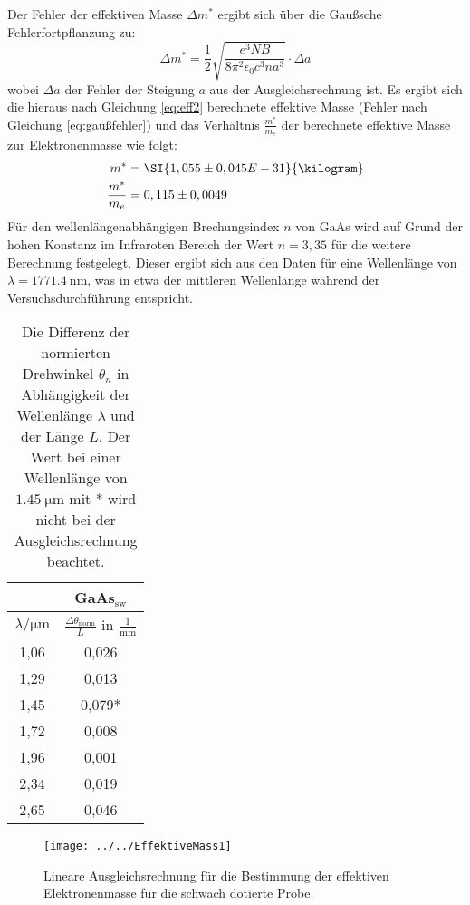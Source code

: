 Der Fehler der effektiven Masse $\Delta m^*$ ergibt sich über die Gaußsche Fehlerfortpflanzung zu:
\begin{equation}
\label{eq:gaußfehler}
\Delta m^* = \frac{1}{2}\sqrt{\frac{e^3NB}{8\pi^2\epsilon_0c^3na^3}} \cdot \Delta a
\end{equation}
wobei $\Delta a$ der Fehler der Steigung $a$ aus der Ausgleichsrechnung ist. Es ergibt sich die hieraus nach Gleichung \ref{eq:eff2} berechnete effektive Masse (Fehler nach Gleichung \ref{eq:gaußfehler}) und das Verhältnis $\frac{m^*}{m_e}$ der berechnete effektive Masse zur Elektronenmasse\cite{Elektronenmasse} wie folgt:
\begin{align*}
m^* &= \SI{1,055 \pm 0,045 E-31}{\kilogram}\\ 
\frac{m^*}{m_e} &= 0,115 \pm 0,0049
\end{align*}
Für den wellenlängenabhängigen Brechungsindex $n$ von GaAs wird auf Grund der hohen Konstanz im Infraroten Bereich der Wert $n = 3,35$ für die weitere Berechnung festgelegt. Dieser ergibt sich aus den Daten\cite{GalliumArsenide} für eine Wellenlänge von $\lambda = \SI{1771,4}{\nano\meter}$, was in etwa der mittleren Wellenlänge während der Versuchsdurchführung entspricht.

\begin{table}[htpb]
	\centering
	\caption{Die Differenz der normierten Drehwinkel $\theta_n$ in Abhängigkeit der Wellenlänge $\lambda$ und der Länge $L$. Der Wert bei einer Wellenlänge von $\SI{1,45}{\micro\meter}$ mit * wird nicht bei der Ausgleichsrechnung beachtet.}
	\label{tab:messwerte5}
	\begin{tabular}{cc}
		\toprule
		& GaAs$_\text{sw}$ \\
		\midrule
		$\lambda / \si{\micro\meter}$ &  $\frac{\Delta\theta_\text{norm}}{L}$ in $\frac{1}{\si{\milli\meter}}$ \\
		\midrule
		1,06 	&  0,026 \\
		1,29	&  0,013 \\
		1,45	&  0,079* \\
		1,72	&  0,008 \\
		1,96	&  0,001 \\
		2,34	&  0,019 \\
		2,65	&  0,046 \\
		\bottomrule
	\end{tabular}
\end{table}

\begin{figure}[h!]
	\centering
	\texttt{[image: ../../EffektiveMass1]}
	\caption{Lineare Ausgleichsrechnung für die Bestimmung der effektiven Elektronenmasse für die schwach dotierte Probe.}
	\label{fig:effektivemass1}
\end{figure}


